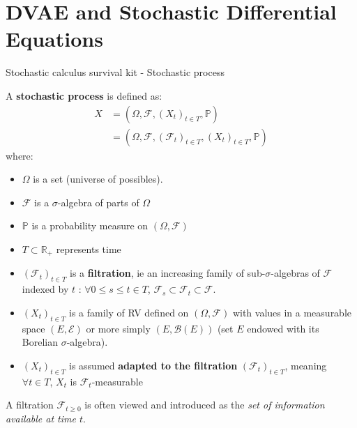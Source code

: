 \section{DVAE and Stochastic Differential Equations}\label{DVAEs and SDEs}


\begin{frame}{Stochastic calculus survival kit - Stochastic process}
    
\begin{definition}
    A \textbf{stochastic process} is defined as:
\begin{align}
    X &= (\Omega, \mathcal{F}, (X_t)_{t \in T}, \mathbb{P}) \\
    &= (\Omega, \mathcal{F}, (\mathcal{F}_t)_{t \in T}, (X_t)_{t \in T}, \mathbb{P})
\end{align}
where:
    \begin{itemize}
        \item $\Omega$ is a set (universe of possibles).
        \item $\mathcal{F}$ is a $\sigma$-algebra of parts of $\Omega$
        \item $\mathbb{P}$ is a probability measure on $(\Omega, \mathcal{F})$
        \item $T \subset \mathbb{R}_+$ represents time
        \item $(\mathcal{F}_t)_{t \in T}$ is a \textbf{filtration}, ie an increasing family of sub-$\sigma$-algebras of $\mathcal{F}$ indexed by $t$ : $\forall 0 \leq s \leq t \in T$, $\mathcal{F}_s \subset \mathcal{F}_t \subset \mathcal{F}$.
        \item $(X_t)_{t \in T}$ is a family of RV defined on $(\Omega, \mathcal{F})$ with values in a measurable space $(E, \mathcal{E})$ or more simply $(E, \mathcal{B}(E))$ (set $E$ endowed with its Borelian $\sigma$-algebra).
        \item $(X_t)_{t \in T}$ is assumed \textbf{adapted to the filtration} $(\mathcal{F}_t)_{t \in T}$, meaning $\forall t \in T$, $X_t$ is $\mathcal{F}_t$-measurable
    \end{itemize}
\end{definition}

A filtration $\mathcal{F}_{t\geq 0}$ is often viewed and introduced as the \textit{set of information available at time $t$}. 

\end{frame}




